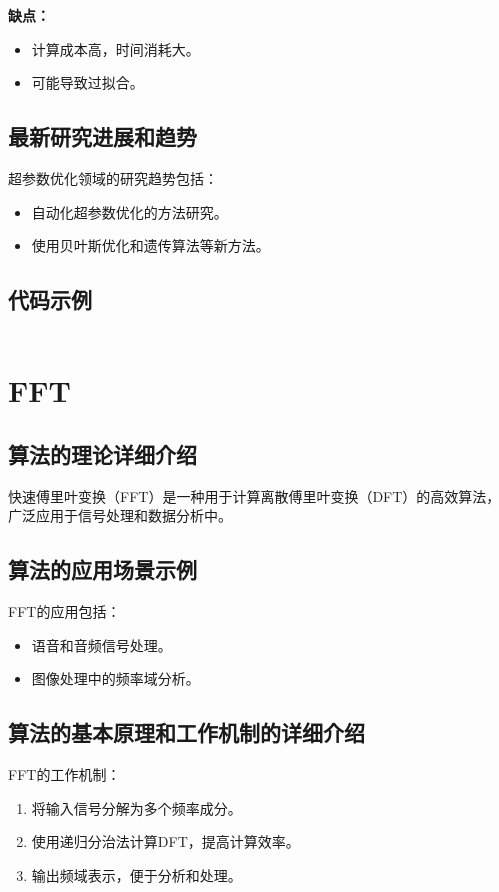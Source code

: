 \textbf{缺点：}
\begin{itemize}
    \item 计算成本高，时间消耗大。
    \item 可能导致过拟合。
\end{itemize}

\subsection*{最新研究进展和趋势}
超参数优化领域的研究趋势包括：
\begin{itemize}
    \item 自动化超参数优化的方法研究。
    \item 使用贝叶斯优化和遗传算法等新方法。
\end{itemize}
\subsection*{代码示例}
\begin{lstlisting}

\end{lstlisting}


\section{FFT}
\subsection*{算法的理论详细介绍}
快速傅里叶变换（FFT）是一种用于计算离散傅里叶变换（DFT）的高效算法，广泛应用于信号处理和数据分析中。

\subsection*{算法的应用场景示例}
FFT的应用包括：
\begin{itemize}
    \item 语音和音频信号处理。
    \item 图像处理中的频率域分析。
\end{itemize}

\subsection*{算法的基本原理和工作机制的详细介绍}
FFT的工作机制：
\begin{enumerate}
    \item 将输入信号分解为多个频率成分。
    \item 使用递归分治法计算DFT，提高计算效率。
    \item 输出频域表示，便于分析和处理。
\end{enumerate}

